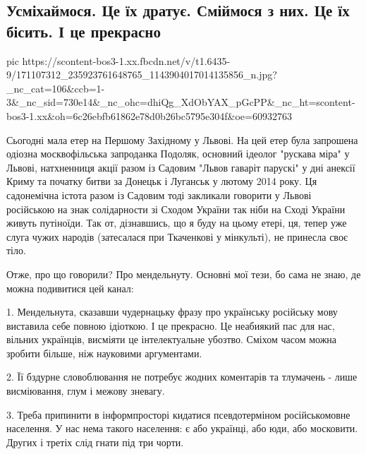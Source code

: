  
 
 
 
 

\subsection{Усміхаймося. Це їх дратує. Сміймося з них. Це їх бісить. І це прекрасно}
\label{sec:08_04_2021.fb.farion_irina.1.lvov_mova_jazyk}


\ifcmt
  pic https://scontent-bos3-1.xx.fbcdn.net/v/t1.6435-9/171107312_235923761648765_1143904017014135856_n.jpg?_nc_cat=106&ccb=1-3&_nc_sid=730e14&_nc_ohc=dhiQg_XdObYAX_pGcPP&_nc_ht=scontent-bos3-1.xx&oh=6c26ebfb61862e78d0b26bc5795e304f&oe=60932763
\fi

Сьогодні мала етер на Першому Західному у Львові. На цей етер була запрошена
одіозна москвофільська запроданка Подоляк, основний ідеолог "рускава міра" у
Львові, натхненниця акції разом із Садовим "Львов гаваріт парускі" у дні
анексії Криму та початку битви за Донецьк і Луганськ у лютому 2014 року. Ця
садонемічна істота разом із Садовим тоді закликали говорити у Львові російською
на знак солідарности зі Сходом України так ніби на Сході України живуть
путіноїди. Так от, дізнавшись, що я буду на цьому етері, ця, тепер уже слуга
чужих народів (затесалася при Ткаченкові у мінкульті), не принесла  своє тіло. 

Отже, про що говорили? Про мендельнуту. Основні мої тези, бо сама не знаю, де
можна подивитися цей канал:

1. Мендельнута, сказавши чудернацьку фразу про українську російську мову
виставила себе повною ідіоткою. І це прекрасно. Це неабиякий пас для нас,
вільних українців, висміяти це інтелектуальне убозтво. Сміхом часом можна
зробити більше, ніж науковими аргументами.

2. Її бздурне словоблювання не потребує жодних коментарів та тлумачень - лише
висміювання, глум і межову зневагу.

3. Треба припинити в інформпросторі кидатися псевдотерміном російськомовне
населення. У нас нема такого населення: є або українці, або юди, або московити.
Других і третіх слід гнати під три чорти.

